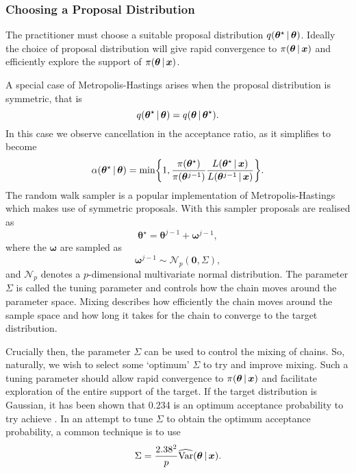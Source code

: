 \subsubsection{Choosing a Proposal Distribution}
\label{ssec:proposal_distribution}

The practitioner must choose a suitable proposal distribution $q(\bm{\theta}^\star \,|\,
\bm{\theta})$. Ideally the choice of proposal distribution will give rapid convergence to
$\pi(\bm{\theta} \,|\, \bm{x})$ and efficiently explore the support of $\pi(\bm{\theta}
\,|\, \bm{x})$.

A special case of Metropolis-Hastings arises when the proposal distribution is symmetric,
that is
\begin{equation*}
	q(\bm{\theta}^\star \,|\, \bm{\theta}) = q(\bm{\theta} \,|\, \bm{\theta}^\star).
\end{equation*}
In this case we observe cancellation in the acceptance ratio, as it simplifies to become
\begin{equation*}
	\alpha({\bm{\theta}}^\star \,|\, \bm{\theta}) = \text{min}\bigg\{ 1,
	\frac{\pi({\bm{\theta}}^\star)}{\pi({\bm{\theta}}^{j-1})} \frac{L(\bm{\theta}^\star \,|\,
		\bm{x})}{L({\bm{\theta}}^{j-1} \,|\, \bm{x})} \bigg\}.
\end{equation*}
The random walk sampler is a popular implementation of Metropolis-Hastings which makes
use of symmetric proposals. With this sampler proposals are realised as
\begin{equation*}
	\bm{\theta}^\star = \bm{\theta}^{j-1} + \bm{\omega}^{j-1},
\end{equation*}
where the $\bm{\omega}$ are sampled as 
\begin{equation*}
	\bm{\omega}^{j-1} \sim \mathcal{N}_p(\bm{0}, \Sigma),
\end{equation*}
and $\mathcal{N}_p$ denotes a $p$-dimensional multivariate normal distribution. The
parameter $\Sigma$ is called the tuning parameter and controls how the chain moves around
the parameter space. Mixing describes how efficiently the chain moves around the sample
space and how long it takes for the chain to converge to the target distribution.

Crucially then, the parameter $\Sigma$ can be used to control the mixing of chains. So,
naturally, we wish to select some `optimum' $\Sigma$ to try and improve mixing. Such a
tuning parameter should allow rapid convergence to $\pi(\bm{\theta} \,|\, \bm{x})$ and
facilitate exploration of the entire support of the target. If the target distribution is
Gaussian, it has been shown that 0.234 is an optimum acceptance probability to try achieve
\parencite{roberts01}. In an attempt to tune $\Sigma$ to obtain the optimum acceptance
probability, a common technique is to use
\begin{equation*}
    \Sigma = \frac{2.38^2}{p} \widehat{\text{Var}}(\bm{\theta} \,|\, \bm{x}).
\end{equation*}

